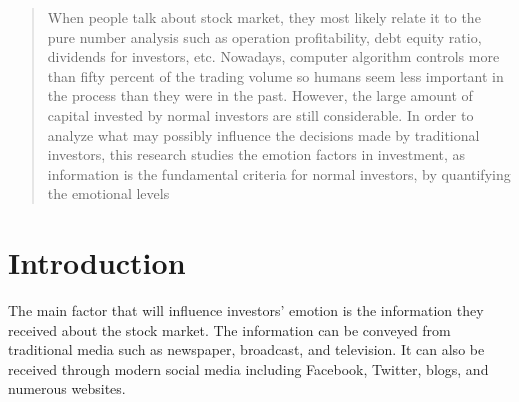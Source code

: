\documentclass[a0,landscape]{a0poster}\usepackage[]{graphicx}\usepackage[]{color}
\begin{document}
\vspace{1cm} %


\begin{multicols}{4} %


\color{Navy} %

\begin{abstract}

When people talk about stock market, they most likely relate it to the pure number analysis such as operation profitability, debt equity ratio, dividends for investors, etc. Nowadays, computer algorithm controls more than fifty percent of the trading volume so humans seem less important in the process than they were in the past. However, the large amount of capital invested by normal investors are still considerable. In order to analyze what may possibly influence the decisions made by traditional investors, this research studies the emotion factors in investment, as information is the fundamental criteria for normal investors, by quantifying the emotional levels

\end{abstract}


\color{SaddleBrown} %

\section*{Introduction}

The main factor that will influence investors' emotion is the information they received about the stock market. The information can be conveyed from traditional media such as newspaper, broadcast, and television. It can also be received through modern social media including Facebook, Twitter, blogs, and numerous websites. 


\end{multicols}
\end{document}
